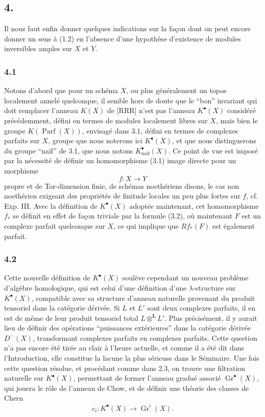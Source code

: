 \documentclass[11pt]{article}
\newcommand{\Gr}{\operatorname{Gr}}
\newcommand{\Parf}{\operatorname{Parf}}
\begin{document}
\subsection*{4.}
Il nous faut enfin donner quelques indications sur la fa\c{c}on dont on peut encore donner un sens \`a (1.2) en l'absence d'une hypoth\`ese d'existence de modules inversibles amples sur $X$ et $Y$.

\subsubsection*{4.1}
Notons d'abord que pour un sch\'ema $X$, ou plus g\'en\'eralement un topos localement annel\'e quelconque, il semble hors de doute que le ``bon'' invariant qui doit remplacer l'anneau $K(X)$ de [RRR] n'est pas l'anneau $K^\bullet(X)$ consid\'er\'e pr\'ec\'edemment, d\'efini en termes de modules localement libres sur $X$, mais bien le groupe $K(\Parf(X))$, envisag\'e dans 3.1, d\'efini en termes de complexes parfaits sur $X$, groupe que nous noterons ici $K^\bullet(X)$, et que nous distinguerons du groupe ``na\"if'' de 3.1, que nous notons $K^\bullet_{\mathrm{naif}}(X)$. Ce point de vue est impos\'e par la n\'ecessit\'e de d\'efinir un homomorphisme (3.1) image directe pour un morphisme
\[
f:X\longrightarrow Y
\]
propre et de Tor-dimension finie, de sch\'emas noeth\'eriens disons, le cas non noeth\'erien exigeant des propri\'et\'es de finitude locales un peu plus fortes sur $f$, cf. Exp. III. Avec la d\'efinition de $K^\bullet(X)$ adopt\'ee maintenant, cet homomorphisme $f_*$ se d\'efinit en effet de fa\c{c}on triviale par la formule (3.2), o\`u maintenant $F$ est un complexe parfait quelconque sur $X$, ce qui implique que $Rf_*(F)$ est \'egalement parfait.

\subsubsection*{4.2}
Cette nouvelle d\'efinition de $K^\bullet(X)$ soul\`eve cependant un nouveau probl\`eme d'alg\`ebre homologique, qui est celui d'une d\'efinition d'une $\lambda$-structure sur $K^\bullet(X)$, compatible avec sa structure d'anneau naturelle provenant du produit tensoriel dans la cat\'egorie d\'eriv\'ee. Si $L$ et $L'$ sont deux complexes parfaits, il en est de m\^eme de leur produit tensoriel total $L\otimes^{\mathbf L}L'$. Plus pr\'ecis\'ement, il y aurait lieu de d\'efinir des op\'erations ``puissances ext\'erieures'' dans la cat\'egorie d\'eriv\'ee $D^-(X)$, transformant complexes parfaits en complexes parfaits. Cette question n'a pas encore \'et\'e tir\'ee au clair \`a l'heure actuelle, et comme il a \'et\'e dit dans l'Introduction, elle constitue la lacune la plus s\'erieuse dans le S\'eminaire. Une fois cette question r\'esolue, et proc\'edant comme dans 2.3, on trouve une filtration naturelle sur $K^\bullet(X)$, permettant de former l'anneau gradu\'e associ\'e $\Gr^\bullet(X)$, qui jouera le r\^ole de l'anneau de Chow, et de d\'efinir une th\'eorie des classes de Chern
\[
c_i:K^\bullet(X)\longrightarrow \Gr^i(X).
\]
\end{document}

